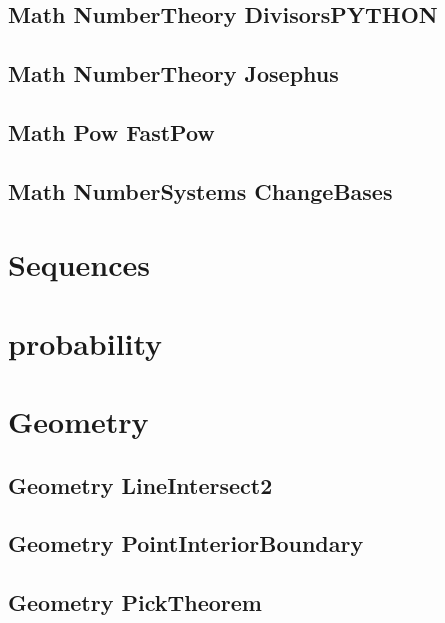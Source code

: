 \subsection{Math NumberTheory DivisorsPYTHON}
\raggedbottom
\hrulefill
\subsection{Math NumberTheory Josephus}
\raggedbottom
\hrulefill
\subsection{Math Pow FastPow}
\raggedbottom
\hrulefill
\subsection{Math NumberSystems ChangeBases}
\raggedbottom
\hrulefill

\section{Sequences}

\section{probability}

\section{Geometry}
\subsection{Geometry LineIntersect2}
\raggedbottom
\hrulefill
\subsection{Geometry PointInteriorBoundary}
\raggedbottom
\hrulefill
\subsection{Geometry PickTheorem}
\raggedbottom
\hrulefill
